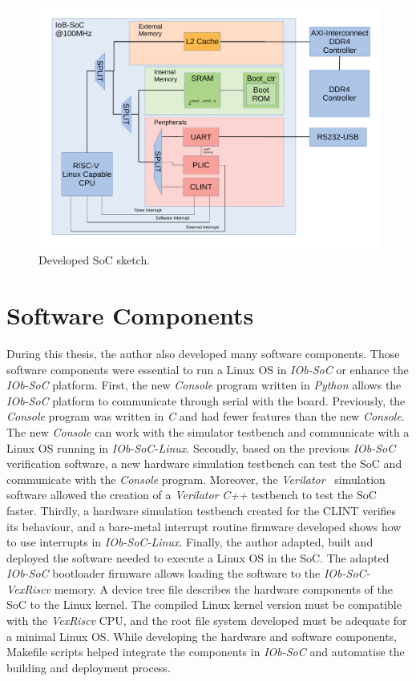 \begin{figure}[!h]
    \centering
    \includegraphics[width=\linewidth]{../images/bd_linux.pdf}
    \caption{Developed SoC sketch.}
    \label{fig:bd_linux}
\end{figure}

\section{Software Components}
\label{sec:software_developed}

During this thesis, the author also developed many software components. Those software components were essential to run a Linux OS in \textit{IOb-SoC} or enhance the \textit{IOb-SoC} platform. First, the new \textit{Console} program written in \textit{Python} allows the \textit{IOb-SoC} platform to communicate through serial with the board. Previously, the \textit{Console} program was written in \textit{C} and had fewer features than the new \textit{Console}. The new \textit{Console} can work with the simulator testbench and communicate with a Linux OS running in \textit{IOb-SoC-Linux}. Secondly, based on the previous \textit{IOb-SoC} verification software, a new hardware simulation testbench can test the SoC and communicate with the \textit{Console} program. Moreover, the \textit{Verilator}~\cite{snyder2010verilator} simulation software allowed the creation of a \textit{Verilator} \textit{C++} testbench to test the SoC faster. Thirdly, a hardware simulation testbench created for the CLINT verifies its behaviour, and a bare-metal interrupt routine firmware developed shows how to use interrupts in \textit{IOb-SoC-Linux}. Finally, the author adapted, built and deployed the software needed to execute a Linux OS in the SoC. The adapted \textit{IOb-SoC} bootloader firmware allows loading the software to the \textit{IOb-SoC-VexRiscv} memory. A device tree file describes the hardware components of the SoC to the Linux kernel. The compiled Linux kernel version must be compatible with the \textit{VexRiscv} CPU, and the root file system developed must be adequate for a minimal Linux OS. While developing the hardware and software components, Makefile scripts helped integrate the components in \textit{IOb-SoC} and automatise the building and deployment process.

